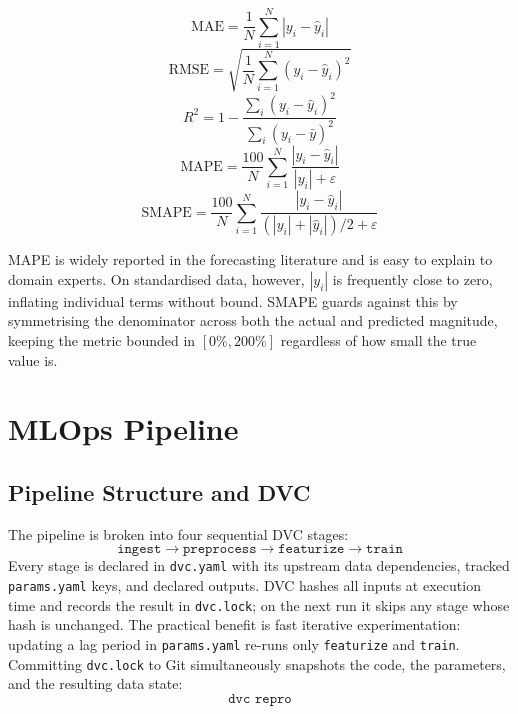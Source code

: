 \documentclass[conference]{IEEEtran}
\begin{document}
  \begin{equation}
    \text{MAE}= \frac{1}{N}\sum_{i=1}^{N}|y_{i} - \hat{y}_{i}|
  \end{equation}
  \begin{equation}
    \text{RMSE}= \sqrt{\frac{1}{N}\sum_{i=1}^{N}(y_{i} - \hat{y}_{i})^{2}}
  \end{equation}
  \begin{equation}
    R^{2} = 1 - \frac{\sum_{i}(y_{i} - \hat{y}_{i})^{2}}{\sum_{i}(y_{i} - \bar{y})^{2}}
  \end{equation}
  \begin{equation}
    \text{MAPE}= \frac{100}{N}\sum_{i=1}^{N}\frac{|y_{i} - \hat{y}_{i}|}{|y_{i}| +
    \varepsilon}
  \end{equation}
  \begin{equation}
    \text{SMAPE}= \frac{100}{N}\sum_{i=1}^{N}\frac{|y_{i} - \hat{y}_{i}|}{(|y_{i}|
    + |\hat{y}_{i}|)/2 + \varepsilon}
  \end{equation}

  MAPE is widely reported in the forecasting literature and is easy to explain to
  domain experts. On standardised data, however, $|y_{i}|$ is frequently close to zero,
  inflating individual terms without bound. SMAPE guards against this by symmetrising
  the denominator across both the actual and predicted magnitude, keeping the metric
  bounded in $[0\%, 200\%]$ regardless of how small the true value is.

  \section{MLOps Pipeline}

  \subsection{Pipeline Structure and DVC}

  The pipeline is broken into four sequential DVC stages:
  \[
    \texttt{ingest}\to \texttt{preprocess}\to \texttt{featurize}\to \texttt{train}
  \]
  Every stage is declared in \texttt{dvc.yaml} with its upstream data dependencies,
  tracked \texttt{params.yaml} keys, and declared outputs. DVC hashes all inputs at
  execution time and records the result in \texttt{dvc.lock}; on the next run it skips
  any stage whose hash is unchanged. The practical benefit is fast iterative
  experimentation: updating a lag period in \texttt{params.yaml} re-runs only
  \texttt{featurize} and \texttt{train}. Committing \texttt{dvc.lock} to Git
  simultaneously snapshots the code, the parameters, and the resulting data state:
  \[
    \texttt{dvc repro}
  \]
\end{document}
